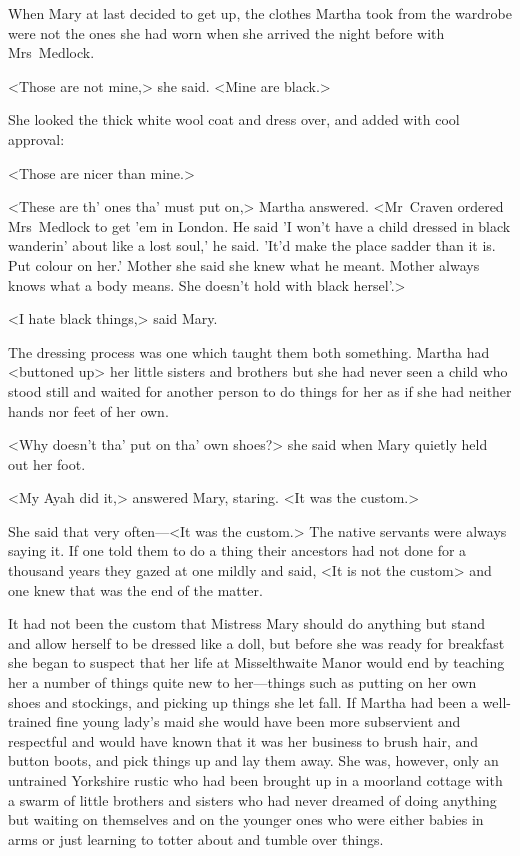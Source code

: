 When Mary at last decided to get up, the clothes Martha took from the wardrobe were not the ones she had worn when she arrived the night before with Mrs~Medlock.

<Those are not mine,> she said. <Mine are black.>

She looked the thick white wool coat and dress over, and added with cool approval:

<Those are nicer than mine.>

<These are th' ones tha' must put on,> Martha answered. <Mr~Craven ordered Mrs~Medlock to get 'em in London. He said 'I won't have a child dressed in black wanderin' about like a lost soul,' he said. 'It'd make the place sadder than it is. Put colour on her.' Mother she said she knew what he meant. Mother always knows what a body means. She doesn't hold with black hersel'.>

<I hate black things,> said Mary.

The dressing process was one which taught them both something. Martha had <buttoned up> her little sisters and brothers but she had never seen a child who stood still and waited for another person to do things for her as if she had neither hands nor feet of her own.

<Why doesn't tha' put on tha' own shoes?> she said when Mary quietly held out her foot.

<My Ayah did it,> answered Mary, staring. <It was the custom.>

She said that very often—<It was the custom.> The native servants were always saying it. If one told them to do a thing their ancestors had not done for a thousand years they gazed at one mildly and said, <It is not the custom> and one knew that was the end of the matter.

It had not been the custom that Mistress Mary should do anything but stand and allow herself to be dressed like a doll, but before she was ready for breakfast she began to suspect that her life at Misselthwaite Manor would end by teaching her a number of things quite new to her—things such as putting on her own shoes and stockings, and picking up things she let fall. If Martha had been a well-trained fine young lady's maid she would have been more subservient and respectful and would have known that it was her business to brush hair, and button boots, and pick things up and lay them away. She was, however, only an untrained Yorkshire rustic who had been brought up in a moorland cottage with a swarm of little brothers and sisters who had never dreamed of doing anything but waiting on themselves and on the younger ones who were either babies in arms or just learning to totter about and tumble over things.

